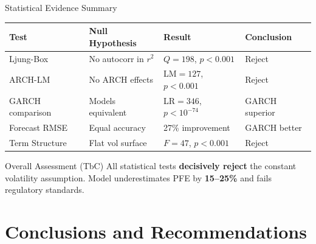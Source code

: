 \documentclass[11pt,aspectratio=169]{beamer}
\begin{document}
 
	\begin{frame}{Statistical Evidence Summary}
		\scriptsize
		\begin{table}
			\begin{tabular}{|p{3cm}|p{3.5cm}|p{3cm}|p{2cm}|}
				\hline
				\textbf{Test} & \textbf{Null Hypothesis} & \textbf{Result} & \textbf{Conclusion} \\
				\hline
				Ljung-Box & No autocorr in $r^2$ & $Q=198$, $p<0.001$ & \textcolor{mufgred}{Reject} \\
				\hline
				ARCH-LM & No ARCH effects & LM$=127$, $p<0.001$ & \textcolor{mufgred}{Reject} \\
				\hline
				GARCH comparison & Models equivalent & LR$=346$, $p<10^{-74}$ & GARCH superior \\
				\hline
				Forecast RMSE & Equal accuracy & 27\% improvement & GARCH better \\
				\hline
				Term Structure & Flat vol surface & $F=47$, $p<0.001$ & \textcolor{mufgred}{Reject} \\
				\hline
 
			\end{tabular}
		\end{table}
		\normalsize
		
		\vspace{0.3cm}
		
		\begin{block}{Overall Assessment (TbC)}
			All statistical tests \textcolor{mufgred}{\textbf{decisively reject}} the constant volatility assumption. Model underestimates PFE by \textbf{15--25\%} and fails regulatory standards.
		\end{block}
	\end{frame}
	
	
	\section{Conclusions and Recommendations}
	
\end{document}
